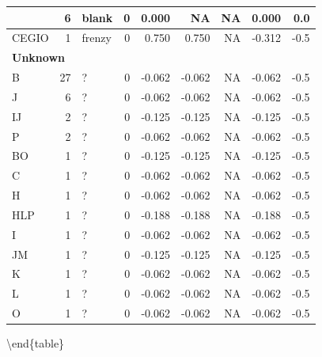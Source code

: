 \documentclass[
  letterpaper,
  DIV=11,
  numbers=noendperiod]{scrreprt}
\begin{document}
\begin{tabular}[t]{l|r|l|r|r|r|r|r|r}
\hline
\hspace{1em} & 6 & blank & 0 & 0.000 & NA & NA & 0.000 & 0.0\\
\hline
\hspace{1em}CEGIO & 1 & frenzy & 0 & 0.750 & 0.750 & NA & -0.312 & -0.5\\
\hline
\multicolumn{9}{l}{\textbf{Unknown}}\\
\hline
\hspace{1em}B & 27 & ? & 0 & -0.062 & -0.062 & NA & -0.062 & -0.5\\
\hline
\hspace{1em}J & 6 & ? & 0 & -0.062 & -0.062 & NA & -0.062 & -0.5\\
\hline
\hspace{1em}IJ & 2 & ? & 0 & -0.125 & -0.125 & NA & -0.125 & -0.5\\
\hline
\hspace{1em}P & 2 & ? & 0 & -0.062 & -0.062 & NA & -0.062 & -0.5\\
\hline
\hspace{1em}BO & 1 & ? & 0 & -0.125 & -0.125 & NA & -0.125 & -0.5\\
\hline
\hspace{1em}C & 1 & ? & 0 & -0.062 & -0.062 & NA & -0.062 & -0.5\\
\hline
\hspace{1em}H & 1 & ? & 0 & -0.062 & -0.062 & NA & -0.062 & -0.5\\
\hline
\hspace{1em}HLP & 1 & ? & 0 & -0.188 & -0.188 & NA & -0.188 & -0.5\\
\hline
\hspace{1em}I & 1 & ? & 0 & -0.062 & -0.062 & NA & -0.062 & -0.5\\
\hline
\hspace{1em}JM & 1 & ? & 0 & -0.125 & -0.125 & NA & -0.125 & -0.5\\
\hline
\hspace{1em}K & 1 & ? & 0 & -0.062 & -0.062 & NA & -0.062 & -0.5\\
\hline
\hspace{1em}L & 1 & ? & 0 & -0.062 & -0.062 & NA & -0.062 & -0.5\\
\hline
\hspace{1em}O & 1 & ? & 0 & -0.062 & -0.062 & NA & -0.062 & -0.5\\
\hline
\end{tabular}

\textbackslash end\{table\}
\end{document}
